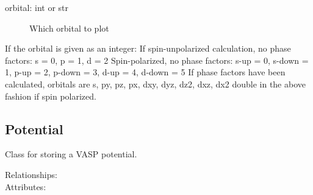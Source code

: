 \documentclass[letterpaper,10pt,english]{sphinxmanual}
\begin{document}
\begin{fulllineitems}
\begin{fulllineitems}
\begin{description}
\item[{orbital: int or str}] \leavevmode
Which orbital to plot

\end{description}

If the orbital is given as an integer:
If spin-unpolarized calculation, no phase factors:
s = 0, p = 1, d = 2
Spin-polarized, no phase factors:
s-up = 0, s-down = 1, p-up = 2, p-down = 3, d-up = 4, d-down = 5
If phase factors have been calculated, orbitals are
s, py, pz, px, dxy, dyz, dz2, dxz, dx2
double in the above fashion if spin polarized.

\end{fulllineitems}


\end{fulllineitems}



\subsection{Potential}
\label{models:potential}

\begin{fulllineitems}
\label{models:qmpy.Potential}
Class for storing a VASP potential.
\begin{description}
\item[{Relationships:}] \leavevmode
{}

\item[{Attributes:}] \leavevmode
{}

\end{description}

\end{fulllineitems}
\end{document}
